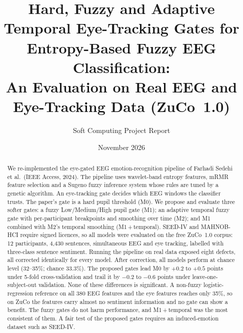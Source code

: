 \documentclass[10pt,a4paper]{article}
\title{Hard, Fuzzy and Adaptive Temporal Eye-Tracking Gates for Entropy-Based Fuzzy EEG Classification:\\
\large An Evaluation on Real EEG and Eye-Tracking Data (ZuCo~1.0)}
\author{Soft Computing Project Report}
\date{November 2026}
\begin{document}
\maketitle

\begin{abstract}
\noindent
We re-implemented the eye-gated EEG emotion-recognition pipeline of Farhadi Sedehi et al.\ (IEEE Access, 2024). The pipeline uses wavelet-band entropy features, mRMR feature selection and a Sugeno fuzzy inference system whose rules are tuned by a genetic algorithm. An eye-tracking gate decides which EEG windows the classifier trusts. The paper's gate is a hard pupil threshold (M0). We propose and evaluate three softer gates: a fuzzy Low/Medium/High pupil gate (M1); an adaptive temporal fuzzy gate with per-participant breakpoints and smoothing over time (M2); and M1 combined with M2's temporal smoothing (M1\,+\,temporal). SEED-IV and MAHNOB-HCI require signed licences, so all models were evaluated on the free ZuCo~1.0 corpus: 12 participants, 4{,}430 sentences, simultaneous EEG and eye tracking, labelled with three-class sentence sentiment. Running the pipeline on real data exposed eight defects, all corrected identically for every model. After correction, all models perform at chance level (32--35\%; chance 33.3\%). The proposed gates lead M0 by $+0.2$ to $+0.5$ points under 5-fold cross-validation and trail it by $-0.2$ to $-0.6$ points under leave-one-subject-out validation. None of these differences is significant. A non-fuzzy logistic-regression reference on all 380 EEG features and the eye features reaches only 35\%, so on ZuCo the features carry almost no sentiment information and no gate can show a benefit. The fuzzy gates do not harm performance, and M1\,+\,temporal was the most consistent of them. A fair test of the proposed gates requires an induced-emotion dataset such as SEED-IV.
\end{abstract}
\end{document}
